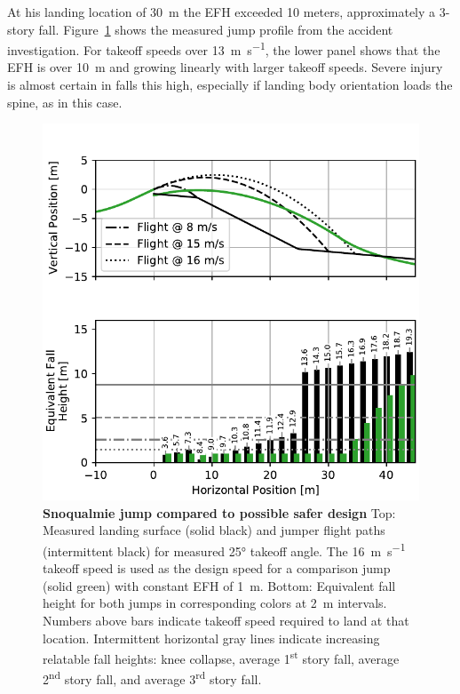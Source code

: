 \documentclass[fleqn,10pt,lineno]{wlpeerj}
\begin{document}
At his landing location of 30~\si{\meter} the EFH exceeded 10 meters,
approximately a 3-story fall. Figure~\ref{fig:salvini-v-snoqualmie} shows the
measured jump profile from the accident investigation.  For takeoff speeds over
13~\si{\meter\per\second}, the lower panel shows that the EFH is over
10~\si{\meter} and growing linearly with larger takeoff speeds.  Severe injury
is almost certain in falls this high, especially if landing body orientation
loads the spine, as in this case.
%
\begin{figure}
  \centering
  \includegraphics[width=4.67690604676906in]{figures/salvini-v-snoqualmie.pdf}
  \caption{\textbf{Snoqualmie jump compared to possible safer design}
  Top: Measured landing surface (solid black) and jumper flight paths
  (intermittent black) for measured 25\si{\degree} takeoff angle. The
  16~\si{\meter\per\second} takeoff speed is used as the design speed for a
  comparison jump (solid green) with constant EFH of
  1~\si{\meter}.
  Bottom: Equivalent fall height for both jumps in corresponding colors at
  2~\si{\meter} intervals. Numbers above bars indicate takeoff speed required
  to land at that location.
  Intermittent horizontal gray lines indicate increasing relatable fall
  heights: knee collapse, average 1\textsuperscript{st} story fall, average
  2\textsuperscript{nd} story fall, and average 3\textsuperscript{rd} story
  fall.
  }
  \label{fig:salvini-v-snoqualmie}
\end{figure}
\end{document}
